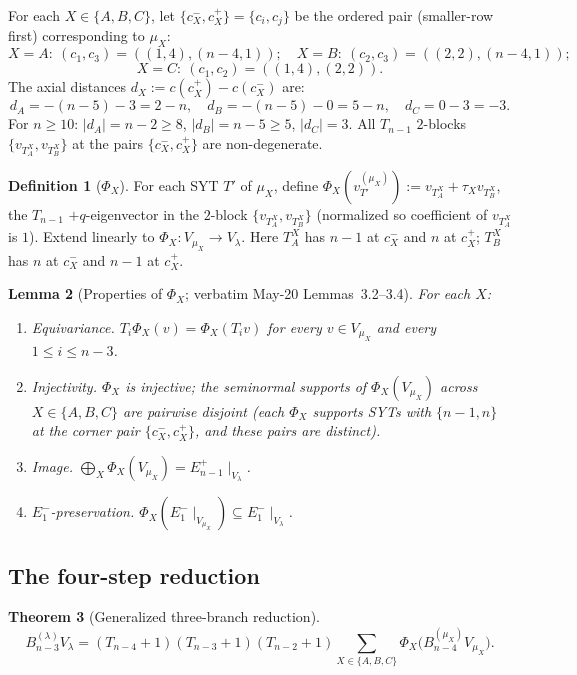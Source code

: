 \documentclass[11pt]{article}
\newtheorem{theorem}{Theorem}
\newtheorem{lemma}[theorem]{Lemma}
\theoremstyle{definition}
\newtheorem{definition}[theorem]{Definition}
\begin{document}
For each $X \in \{A, B, C\}$, let $\{c_X^-, c_X^+\} = \{c_i, c_j\}$
be the ordered pair (smaller-row first) corresponding to $\mu_X$:
\[
   X = A:\ (c_1, c_3) = ((1, 4), (n-4, 1));\quad
   X = B:\ (c_2, c_3) = ((2, 2), (n-4, 1));
\]
\[
   X = C:\ (c_1, c_2) = ((1, 4), (2, 2)).
\]
The axial distances $d_X := c(c_X^+) - c(c_X^-)$ are:
\[
   d_A = -(n-5) - 3 = 2 - n,\quad
   d_B = -(n-5) - 0 = 5 - n,\quad
   d_C = 0 - 3 = -3.
\]
For $n \ge 10$: $|d_A| = n-2 \ge 8$, $|d_B| = n-5 \ge 5$,
$|d_C| = 3$. All $T_{n-1}$ $2$-blocks $\{v_{T^X_A}, v_{T^X_B}\}$ at
the pairs $\{c_X^-, c_X^+\}$ are non-degenerate.

\begin{definition}[$\Phi_X$]
For each SYT $T'$ of $\mu_X$, define
$\Phi_X(v_{T'}^{(\mu_X)}) := v_{T^X_A} + \tau_X v_{T^X_B}$,
the $T_{n-1}$ $+q$-eigenvector in the $2$-block
$\{v_{T^X_A}, v_{T^X_B}\}$ (normalized so coefficient of
$v_{T^X_A}$ is $1$). Extend linearly to
$\Phi_X: V_{\mu_X} \to V_\lambda$. Here $T^X_A$ has $n-1$ at
$c_X^-$ and $n$ at $c_X^+$; $T^X_B$ has $n$ at $c_X^-$ and $n-1$
at $c_X^+$.
\end{definition}

\begin{lemma}[Properties of $\Phi_X$; verbatim May-20 Lemmas~3.2--3.4]
\label{lem:Phi}
For each $X$:
\begin{enumerate}[leftmargin=2em,topsep=0.3em]
\item \emph{Equivariance.} $T_i \Phi_X(v) = \Phi_X(T_i v)$ for
every $v \in V_{\mu_X}$ and every $1 \le i \le n-3$.
\item \emph{Injectivity.} $\Phi_X$ is injective; the seminormal
supports of $\Phi_X(V_{\mu_X})$ across $X \in \{A, B, C\}$ are
pairwise disjoint (each $\Phi_X$ supports SYTs with
$\{n-1, n\}$ at the corner pair $\{c_X^-, c_X^+\}$, and these
pairs are distinct).
\item \emph{Image.} $\bigoplus_X \Phi_X(V_{\mu_X}) =
E_{n-1}^+\!\mid_{V_\lambda}$.
\item \emph{$E_1^-$-preservation.} $\Phi_X(E_1^-\!\mid_{V_{\mu_X}})
\subseteq E_1^-\!\mid_{V_\lambda}$.
\end{enumerate}
\end{lemma}

\subsection{The four-step reduction}

\begin{theorem}[Generalized three-branch reduction]\label{thm:reduction}
\begin{equation}\label{eq:reduction}
   B_{n-3}^{(\lambda)} V_\lambda
   = (T_{n-4}{+}1)(T_{n-3}{+}1)(T_{n-2}{+}1)
     \sum_{X \in \{A, B, C\}}
     \Phi_X\big(B_{n-4}^{(\mu_X)} V_{\mu_X}\big).
\end{equation}
\end{theorem}
\end{document}
